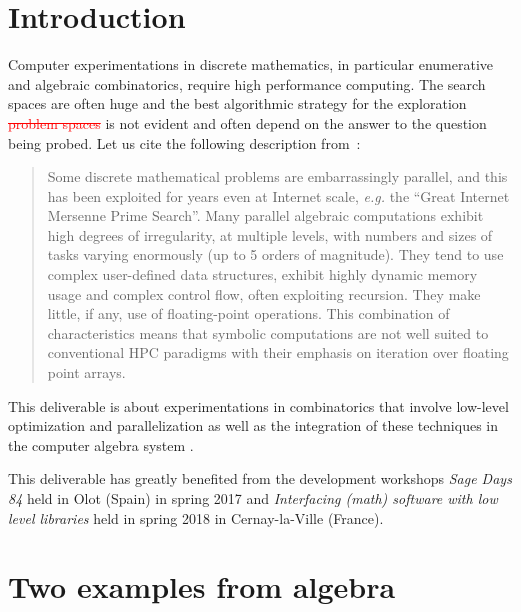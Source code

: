 \documentclass{deliverablereport}
\author{V. Delecroix, F. Hivert}
\begin{document}
\maketitle

\tableofcontents


\section{Introduction}

Computer experimentations in discrete mathematics, in particular
enumerative and algebraic combinatorics, require high performance
computing. The search spaces are often huge and the best algorithmic
strategy for the exploration \textcolor{red}{\sout{problem spaces}} is not evident and often depend on
the answer to the question being probed. Let us cite the following description
from~\cite{LoidlTrinder-Hecke}:
\begin{quote}{}
  Some discrete mathematical problems are embarrassingly parallel, and this
  has been exploited for years even at Internet scale, \emph{e.g.} the “Great
  Internet Mersenne Prime Search”.  Many parallel algebraic computations
  exhibit high degrees of irregularity, at multiple levels, with numbers and
  sizes of tasks varying enormously (up to 5 orders of magnitude). They tend
  to use complex user-defined data structures, exhibit highly dynamic memory
  usage and complex control flow, often exploiting recursion. They make
  little, if any, use of floating-point operations.  This combination of
  characteristics means that symbolic computations are not well suited to
  conventional HPC paradigms with their emphasis on iteration over floating
  point arrays.
\end{quote}

This deliverable is about experimentations in combinatorics
that involve low-level optimization and parallelization as
well as the integration of these techniques in the computer
algebra system \Sage.

This deliverable has greatly benefited from the \ODK development
workshops \textit{Sage Days 84} held in Olot (Spain) in spring 2017
and \textit{Interfacing (math) software with low level libraries}
held in spring 2018 in Cernay-la-Ville (France).


\section{Two examples from algebra}
\end{document}
